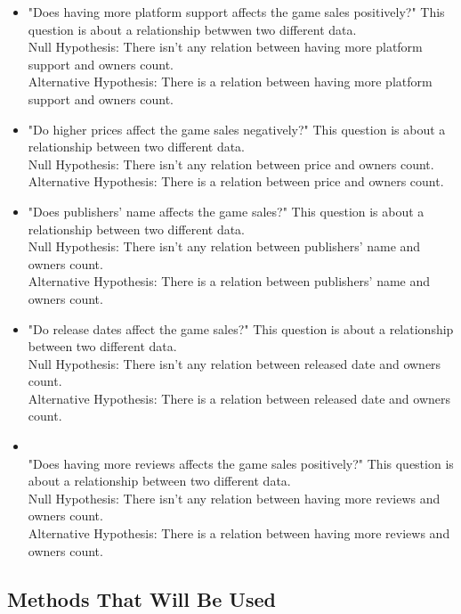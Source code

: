 \documentclass[conference]{IEEEtran}
\begin{document}
\begin{itemize}
    \item "Does having more platform support affects the game sales positively?" This question is about a relationship betwwen two different data.\\Null
Hypothesis: There isn't any relation between having more platform support and owners count.\\ Alternative Hypothesis: There is a relation between having more platform support and owners count. \\
    \item "Do higher prices affect the game sales negatively?" This question is about a relationship between two different data.\\Null
Hypothesis: There isn't any relation between price and owners count.\\ Alternative Hypothesis: There is a relation between price and owners count. \\
    \item "Does publishers' name affects the game sales?" This question is about a relationship between two different data.\\Null
Hypothesis: There isn't any relation between  publishers' name and owners count.\\ Alternative Hypothesis: There is a relation between  publishers' name and owners count. \\
    \item "Do release dates affect the game sales?" This question is about a relationship between two different data.\\Null
Hypothesis: There isn't any relation between released date and owners count.\\ Alternative Hypothesis: There is a relation between released date and owners count. \\
    \item \\"Does having more reviews affects the game sales positively?" This question is about a relationship between two different data.\\Null
Hypothesis: There isn't any relation between  having more reviews and owners count.\\ Alternative Hypothesis: There is a relation between  having more reviews and owners count. \\
\end{itemize}

\subsection{Methods That Will Be Used}
\end{document}
